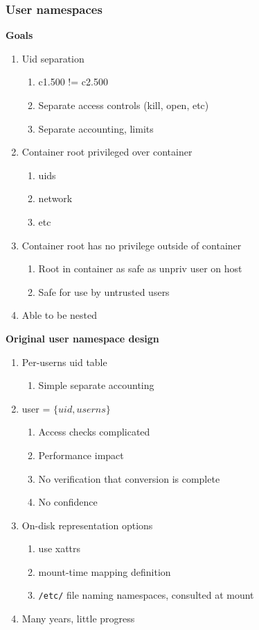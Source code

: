 \documentclass{beamer}
\begin{document}
\begin{frame}[fragile]
\frametitle{User namespaces}
\textbf{Goals}
\begin{enumerate}
\item Uid separation
	\begin{enumerate}
	\item c1.500 != c2.500
	\item Separate access controls (kill, open, etc)
	\item Separate accounting, limits
	\end{enumerate}
\item Container root privileged over container
	\begin{enumerate}
	\item uids
	\item network
	\item etc
	\end{enumerate}
\item Container root has no privilege outside of container
	\begin{enumerate}
	\item Root in container as safe as unpriv user on host
	\item Safe for use by untrusted users
	\end{enumerate}
\item Able to be nested
\end{enumerate}
\end{frame}

\begin{frame}
\textbf{Original user namespace design}
\begin{enumerate}
\item Per-userns uid table
	\begin{enumerate}
	\item Simple separate accounting
	\end{enumerate}
\item user = $\{ uid, userns \}$
	\begin{enumerate}
	\item Access checks complicated
	\item Performance impact
	\item No verification that conversion is complete
	\item No confidence
	\end{enumerate}
\item On-disk representation options
	\begin{enumerate}
	\item use xattrs
	\item mount-time mapping definition
	\item {\tt /etc/} file naming namespaces, consulted at mount
	\end{enumerate}
\item Many years, little progress
\end{enumerate}
\end{frame}
\end{document}
